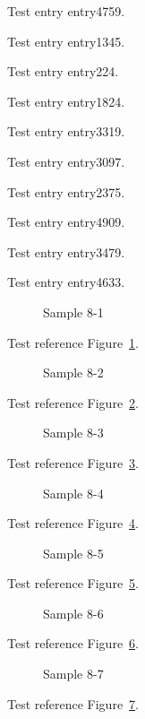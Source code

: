 Test entry \gls{entry4759}.

Test entry \gls{entry1345}.

Test entry \gls{entry224}.

Test entry \gls{entry1824}.

Test entry \gls{entry3319}.

Test entry \gls{entry3097}.

Test entry \gls{entry2375}.

Test entry \gls{entry4909}.

Test entry \gls{entry3479}.

Test entry \gls{entry4633}.

\begin{figure}[tbhp]
\caption{Sample 8-1}
\label{fig:sample-8-1}
\end{figure}

Test reference Figure~\ref{fig:sample-8-1}.

\begin{figure}[tbhp]
\caption{Sample 8-2}
\label{fig:sample-8-2}
\end{figure}

Test reference Figure~\ref{fig:sample-8-2}.

\begin{figure}[tbhp]
\caption{Sample 8-3}
\label{fig:sample-8-3}
\end{figure}

Test reference Figure~\ref{fig:sample-8-3}.

\begin{figure}[tbhp]
\caption{Sample 8-4}
\label{fig:sample-8-4}
\end{figure}

Test reference Figure~\ref{fig:sample-8-4}.

\begin{figure}[tbhp]
\caption{Sample 8-5}
\label{fig:sample-8-5}
\end{figure}

Test reference Figure~\ref{fig:sample-8-5}.

\begin{figure}[tbhp]
\caption{Sample 8-6}
\label{fig:sample-8-6}
\end{figure}

Test reference Figure~\ref{fig:sample-8-6}.

\begin{figure}[tbhp]
\caption{Sample 8-7}
\label{fig:sample-8-7}
\end{figure}

Test reference Figure~\ref{fig:sample-8-7}.

